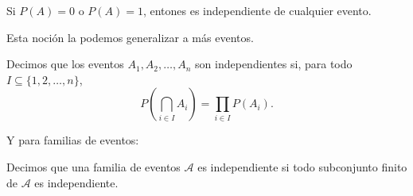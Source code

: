 \begin{remark}
    Si $P(A) = 0$ o $P(A) = 1$, entones es independiente de cualquier evento.
\end{remark}

Esta noción la podemos generalizar a más eventos.

\begin{definition}
    Decimos que los eventos $A_1, A_2, \ldots, A_n$ son independientes si, para todo $I \subseteq \{1, 2, \ldots, n\}$,
    \begin{equation*}
        P\left(\bigcap_{i \in I} A_i\right) = \prod_{i \in I} P(A_i).
    \end{equation*}
\end{definition}

Y para familias de eventos:

\begin{definition}
    Decimos que una familia de eventos $\mathcal{A}$ es independiente si todo subconjunto finito de $\mathcal{A}$ es independiente.
\end{definition}